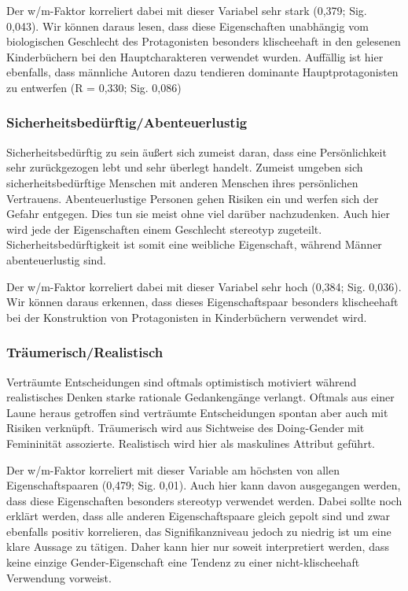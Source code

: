 Der w/m-Faktor korreliert dabei mit dieser Variabel sehr stark (0,379;
Sig. 0,043). Wir können daraus lesen, dass diese Eigenschaften
unabhängig vom biologischen Geschlecht des Protagonisten besonders
klischeehaft in den gelesenen Kinderbüchern bei den Hauptcharakteren
verwendet wurden. Auffällig ist hier ebenfalls, dass männliche Autoren
dazu tendieren dominante Hauptprotagonisten zu entwerfen (R = 0,330;
Sig. 0,086)

\subsubsection{Sicherheitsbedürftig/Abenteuerlustig}

Sicherheitsbedürftig zu sein äußert sich zumeist daran, dass eine
Persönlichkeit sehr zurückgezogen lebt und sehr überlegt handelt.
Zumeist umgeben sich sicherheitsbedürftige Menschen mit anderen Menschen
ihres persönlichen Vertrauens. Abenteuerlustige Personen gehen Risiken
ein und werfen sich der Gefahr entgegen. Dies tun sie meist ohne viel
darüber nachzudenken. Auch hier wird jede der Eigenschaften einem
Geschlecht stereotyp zugeteilt. Sicherheitsbedürftigkeit ist somit eine
weibliche Eigenschaft, während Männer abenteuerlustig sind.

Der w/m-Faktor korreliert dabei mit dieser Variabel sehr hoch (0,384;
Sig. 0,036). Wir können daraus erkennen, dass dieses Eigenschaftspaar
besonders klischeehaft bei der Konstruktion von Protagonisten in
Kinderbüchern verwendet wird.

\subsubsection{Träumerisch/Realistisch}

Verträumte Entscheidungen sind oftmals optimistisch motiviert während
realistisches Denken starke rationale Gedankengänge verlangt. Oftmals
aus einer Laune heraus getroffen sind verträumte Entscheidungen spontan
aber auch mit Risiken verknüpft. Träumerisch wird aus Sichtweise des
Doing-Gender mit Femininität assozierte. Realistisch wird hier als
maskulines Attribut geführt.

Der w/m-Faktor korreliert mit dieser Variable am höchsten von allen
Eigenschaftspaaren (0,479; Sig. 0,01). Auch hier kann davon ausgegangen
werden, dass diese Eigenschaften besonders stereotyp verwendet werden.
Dabei sollte noch erklärt werden, dass alle anderen Eigenschaftspaare
gleich gepolt sind und zwar ebenfalls positiv korrelieren, das
Signifikanzniveau jedoch zu niedrig ist um eine klare Aussage zu
tätigen. Daher kann hier nur soweit interpretiert werden, dass keine
einzige Gender-Eigenschaft eine Tendenz zu einer nicht-klischeehaft
Verwendung vorweist.

